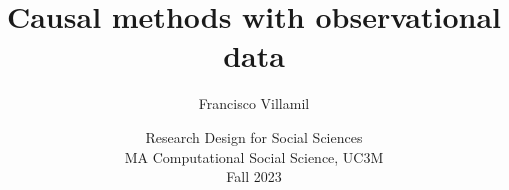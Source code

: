 \documentclass[aspectratio=43]{beamer}
\title[Lecture 4: Causal methods]{\Large Causal methods with observational data}
\author[]{Francisco Villamil}
\date[]{Research Design for Social Sciences\\MA Computational Social Science, UC3M\\Fall 2023}
\begin{document}

\begin{frame}
  \titlepage
\end{frame}


\end{document}
